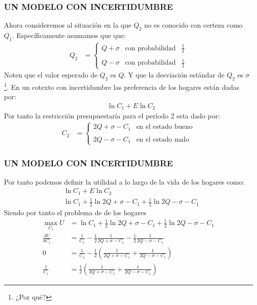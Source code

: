 \documentclass[10pt, xcolor=table, x11names]{beamer}
\begin{document}
\begin{frame}[label=5]
	\frametitle{{\normalsize  UN MODELO CON INCERTIDUMBRE} {}}
	Ahora consideremos al situación en la que $Q_{2} $ no es conocido con certeza como  $Q_{1} $. Específicamente asumamos que que:
	\begin{align}
	Q_{2}&=\left\{ \begin{array}{lcl}
	Q+\sigma & \mbox{con probabilidad} & \frac{1}{2} \\
	 & &  \\
	Q-\sigma & \mbox{con probabilidad} & \frac{1}{2} 
	\end{array}
	\right.
	\end{align}
	Noten que el valor esperado de $Q_{2} $  es $Q $. Y que la desviación estándar de $Q_{2} $  es $ \sigma$\footnote{¿Por qué?}. En un cotexto con incertidumbre las preferencia de los hogares están dadas por:
	\begin{align}
	&\ln{C_{1}}+E\ln{C_{2}}
	\end{align}
	 Por tanto la restricción presupuestaría para el período 2 esta dado por:
	 \begin{align}
	 C_{2}&=\left\{ \begin{array}{lc}
	 2Q+\sigma-C_{1} & \mbox{en el estado bueno} \\
	 &   \\
	2Q-\sigma-C_{1} & \mbox{en el estado malo}
	 \end{array}
	 \right.
	 \end{align}	
\end{frame}

\begin{frame}[label=6]
	\frametitle{{\normalsize  UN MODELO CON INCERTIDUMBRE} {}}
Por tanto podemos definir la utilidad a lo largo de la vida de los hogares como:
\begin{align}
&\ln{C_{1}}+E\ln{C_{2}}\nonumber \\
&\ln{C_{1}}+\frac{1}{2}\ln{2Q+\sigma-C_{1}}+\frac{1}{2}\ln{2Q-\sigma-C_{1}}
\end{align}
Siendo por tanto el problema de de los hogares
\begin{align}
\max_{C_{1}}U&=\ln{C_{1}}+\frac{1}{2}\ln{2Q+\sigma-C_{1}}+\frac{1}{2}\ln{2Q-\sigma-C_{1}}\nonumber \\
\frac{\delta U}{\delta C_{1}}&=\frac{1}{C_{1}}-\frac{1}{2}\frac{1}{2Q+\sigma-C_{1}}-\frac{1}{2}\frac{1}{2Q-\sigma-C_{1}}\nonumber\\
0&=\frac{1}{C_{1}}-\frac{1}{2}(\frac{1}{2Q+\sigma-C_{1}}+\frac{1}{2Q-\sigma-C_{1}})\nonumber\\
\frac{1}{C_{1}}&=\frac{1}{2}(\frac{1}{2Q+\sigma-C_{1}}+\frac{1}{2Q-\sigma-C_{1}})
\end{align}

\end{frame}
\end{document}
